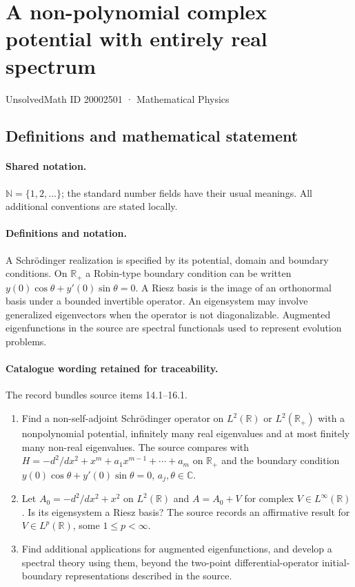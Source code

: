 \documentclass[11pt]{article}
\begin{document}
\setcounter{section}{20002500}
\section{A non-polynomial complex potential with entirely real spectrum}\label{20002501}
{\small UnsolvedMath ID 20002501 · Mathematical Physics}
\subsection{Definitions and mathematical statement}

\paragraph{Shared notation.}$\mathbb N=\{1,2,\ldots\}$; the standard number fields have their usual meanings. All additional conventions are stated locally.


\paragraph{Definitions and notation.}A Schrödinger realization is specified by its potential, domain and boundary conditions. On $\mathbb R_+$ a Robin-type boundary condition can be written $y(0)\cos\theta+y'(0)\sin\theta=0$. A Riesz basis is the image of an orthonormal basis under a bounded invertible operator. An eigensystem may involve generalized eigenvectors when the operator is not diagonalizable. Augmented eigenfunctions in the source are spectral functionals used to represent evolution problems.

\paragraph{Catalogue wording retained for traceability.}
The record bundles source items 14.1--16.1.
\begin{enumerate}
\item Find a non-self-adjoint Schrödinger operator on $L^2(\mathbb R)$ or $L^2(\mathbb R_+)$ with a nonpolynomial potential, infinitely many real eigenvalues and at most finitely many non-real eigenvalues. The source compares with $H=-d^2/dx^2+x^m+a_1x^{m-1}+\cdots+a_m$ on $\mathbb R_+$ and the boundary condition $y(0)\cos\theta+y'(0)\sin\theta=0$, $a_j,\theta\in\mathbb C$.
\item Let $A_0=-d^2/dx^2+x^2$ on $L^2(\mathbb R)$ and $A=A_0+V$ for complex $V\in L^\infty(\mathbb R)$. Is its eigensystem a Riesz basis? The source records an affirmative result for $V\in L^p(\mathbb R)$, some $1\le p<\infty$.
\item Find additional applications for augmented eigenfunctions, and develop a spectral theory using them, beyond the two-point differential-operator initial-boundary representations described in the source.
\end{enumerate}
\end{document}
